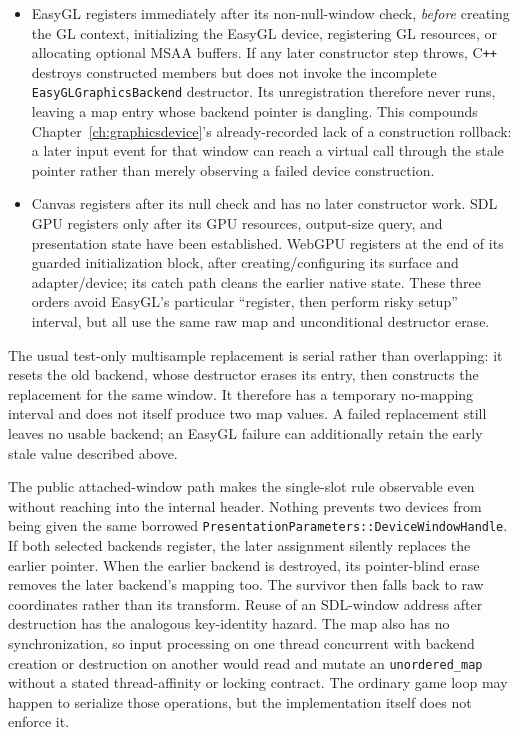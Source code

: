 \begin{itemize}
\item EasyGL registers immediately after its non-null-window check, \emph{before} creating the
  GL context, initializing the EasyGL device, registering GL resources, or allocating optional
  MSAA buffers.  If any later constructor step throws, C\texttt{++} destroys constructed members
  but does not invoke the incomplete \texttt{EasyGLGraphicsBackend} destructor.  Its
  unregistration therefore never runs, leaving a map entry whose backend pointer is dangling.
  This compounds Chapter~\ref{ch:graphicsdevice}'s already-recorded lack of a  construction
  rollback: a later input event for that window can reach a virtual call through the stale
  pointer rather than merely observing a failed device construction.
\item Canvas registers after its null check and has no later constructor work.  SDL GPU registers
  only after its GPU resources, output-size query, and presentation state have been established.
  WebGPU registers at the end of its guarded initialization block, after creating/configuring its
  surface and adapter/device; its catch path cleans the earlier native state.  These three orders
  avoid EasyGL's particular ``register, then perform risky setup'' interval, but all use the
  same raw map and unconditional destructor erase.
\end{itemize}

The usual test-only multisample replacement is serial rather than overlapping: it resets the old
backend, whose destructor erases its entry, then constructs the replacement for the same window.
It therefore has a temporary no-mapping interval and does not itself produce two map values.  A
failed replacement still leaves no usable backend; an EasyGL failure can additionally retain the
early stale value described above.

The public attached-window path makes the single-slot rule observable even without reaching into
the internal header.  Nothing prevents two devices from being given the same borrowed
\texttt{PresentationParameters::DeviceWindowHandle}.  If both selected backends register, the
later assignment silently replaces the earlier pointer.  When the earlier backend is destroyed,
its pointer-blind erase removes the later backend's mapping too.  The survivor then falls back to
raw coordinates rather than its transform.  Reuse of an SDL-window address after destruction has
the analogous key-identity hazard.  The map also has no synchronization, so input processing on
one thread concurrent with backend creation or destruction on another would read and mutate an
\texttt{unordered\_map} without a stated thread-affinity or locking contract.  The ordinary game
loop may happen to serialize those operations, but the implementation itself does not enforce it.

